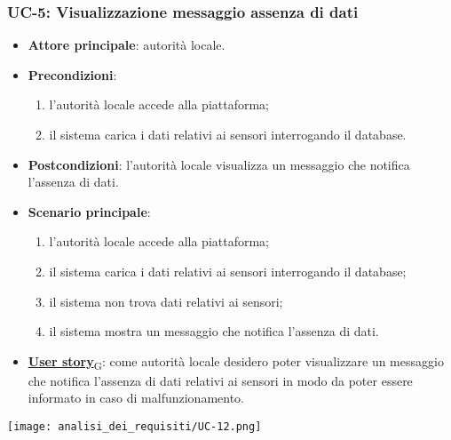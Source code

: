 
\subsubsection{UC-5: Visualizzazione messaggio assenza di dati}
\begin{itemize}
	\item \textbf{Attore principale}: autorità locale.
	\item \textbf{Precondizioni}:
	      \begin{enumerate}
		      \item l'autorità locale accede alla piattaforma;
		      \item il sistema carica i dati relativi ai sensori interrogando il database.
	      \end{enumerate}
	\item \textbf{Postcondizioni}: l'autorità locale visualizza un messaggio che notifica l'assenza di dati.
	\item \textbf{Scenario principale}:
	      \begin{enumerate}
		      \item l'autorità locale accede alla piattaforma;
		      \item il sistema carica i dati relativi ai sensori interrogando il database;
		      \item il sistema non trova dati relativi ai sensori;
		      \item il sistema mostra un messaggio che notifica l'assenza di dati.
	      \end{enumerate}
	\item \href{https://7last.github.io/docs/pb/documentazione-interna/glossario\#user-story}{\textbf{User story}\textsubscript{G}}:
	      come autorità locale desidero poter visualizzare un messaggio che notifica l'assenza di dati relativi ai sensori
	      in modo da poter essere informato in caso di malfunzionamento.
\end{itemize}
\begin{center}
	\texttt{[image: analisi\_dei\_requisiti/UC-12.png]}
\end{center}

